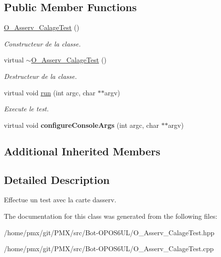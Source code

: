 \subsection*{Public Member Functions}
\begin{DoxyCompactItemize}
\item 
\mbox{\label{classO__Asserv__CalageTest_a42db87468f3314ee2c2e4cb55de87526}} 
\hyperlink{classO__Asserv__CalageTest_a42db87468f3314ee2c2e4cb55de87526}{O\+\_\+\+Asserv\+\_\+\+Calage\+Test} ()
\begin{DoxyCompactList}\small\item\em Constructeur de la classe. \end{DoxyCompactList}\item 
\mbox{\label{classO__Asserv__CalageTest_a81848ab826f5e3af22cc78241fd4d7bd}} 
virtual \hyperlink{classO__Asserv__CalageTest_a81848ab826f5e3af22cc78241fd4d7bd}{$\sim$\+O\+\_\+\+Asserv\+\_\+\+Calage\+Test} ()
\begin{DoxyCompactList}\small\item\em Destructeur de la classe. \end{DoxyCompactList}\item 
\mbox{\label{classO__Asserv__CalageTest_ad731f64308b62269f060e74c0282e30f}} 
virtual void \hyperlink{classO__Asserv__CalageTest_ad731f64308b62269f060e74c0282e30f}{run} (int argc, char $\ast$$\ast$argv)
\begin{DoxyCompactList}\small\item\em Execute le test. \end{DoxyCompactList}\item 
\mbox{\label{classO__Asserv__CalageTest_a8701847a7cb9e96665a0b9711ee96441}} 
virtual void {\bfseries configure\+Console\+Args} (int argc, char $\ast$$\ast$argv)
\end{DoxyCompactItemize}
\subsection*{Additional Inherited Members}


\subsection{Detailed Description}
Effectue un test avec la carte d\textquotesingle{}asserv. 

The documentation for this class was generated from the following files\+:\begin{DoxyCompactItemize}
\item 
/home/pmx/git/\+P\+M\+X/src/\+Bot-\/\+O\+P\+O\+S6\+U\+L/O\+\_\+\+Asserv\+\_\+\+Calage\+Test.\+hpp\item 
/home/pmx/git/\+P\+M\+X/src/\+Bot-\/\+O\+P\+O\+S6\+U\+L/O\+\_\+\+Asserv\+\_\+\+Calage\+Test.\+cpp\end{DoxyCompactItemize}
